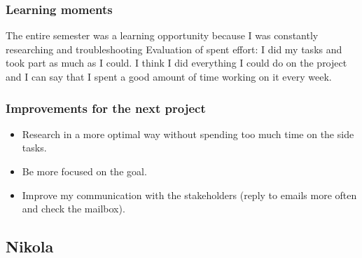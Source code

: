 \documentclass[10pt, a4paper]{article}
\begin{document}
\subsubsection{Learning moments}

The entire semester was a learning opportunity because I was constantly researching and troubleshooting Evaluation of spent effort: I did my tasks and took part as much as I could. I think I did everything I could do on the project and I can say that I spent a good amount of time working on it every week.


\subsubsection{Improvements for the next project}
\begin{itemize}
    \item Research in a more optimal way without spending too much time on the side tasks.
    \item Be more focused on the goal.
    \item Improve my communication with the stakeholders (reply to emails more often and check the mailbox).
\end{itemize}




\subsection{Nikola}
\end{document}
